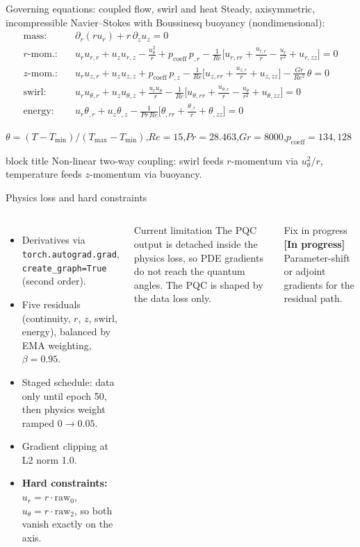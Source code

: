 \documentclass[aspectratio=169,10pt]{beamer}
\newcommand{\pending}{\textcolor{warnorange}{\textbf{[In progress]}}}
\newcommand{\takeaway}[1]{%
  \vfill
  \begin{beamercolorbox}[rounded=true,shadow=false,wd=\linewidth,sep=4pt]{block title}
  \small\centering #1
  \end{beamercolorbox}}
\begin{document}
\begin{frame}{Governing equations: coupled flow, swirl and heat}
\small Steady, axisymmetric, incompressible Navier--Stokes with Boussinesq buoyancy (nondimensional):
\begin{align*}
\text{mass:}\quad & \partial_r(r u_r) + r\,\partial_z u_z = 0\\[2pt]
\text{$r$-mom.:}\quad & u_r u_{r,r} + u_z u_{r,z} - \tfrac{u_\theta^2}{r} + p_{\mathrm{coeff}}\,p_{,r} - \tfrac{1}{Re}\big[u_{r,rr} + \tfrac{u_{r,r}}{r} - \tfrac{u_r}{r^2} + u_{r,zz}\big] = 0\\[2pt]
\text{$z$-mom.:}\quad & u_r u_{z,r} + u_z u_{z,z} + p_{\mathrm{coeff}}\,p_{,z} - \tfrac{1}{Re}\big[u_{z,rr} + \tfrac{u_{z,r}}{r} + u_{z,zz}\big] - \tfrac{Gr}{Re^2}\,\theta = 0\\[2pt]
\text{swirl:}\quad & u_r u_{\theta,r} + u_z u_{\theta,z} + \tfrac{u_r u_\theta}{r} - \tfrac{1}{Re}\big[u_{\theta,rr} + \tfrac{u_{\theta,r}}{r} - \tfrac{u_\theta}{r^2} + u_{\theta,zz}\big] = 0\\[2pt]
\text{energy:}\quad & u_r \theta_{,r} + u_z \theta_{,z} - \tfrac{1}{Pr\,Re}\big[\theta_{,rr} + \tfrac{\theta_{,r}}{r} + \theta_{,zz}\big] = 0
\end{align*}
\begin{center}
\footnotesize $\theta = (T-T_{\min})/(T_{\max}-T_{\min})$,\quad $Re=15$,\quad $Pr=28.463$,\quad $Gr=8000$,\quad $p_{\mathrm{coeff}}=134{,}128$
\end{center}
\takeaway{Non-linear two-way coupling: swirl feeds $r$-momentum via $u_\theta^2/r$, temperature feeds $z$-momentum via buoyancy.}
\end{frame}

\begin{frame}{Physics loss and hard constraints}
\begin{columns}[T,onlytextwidth]
\begin{itemize}\small\setlength{\itemsep}{3pt}
  \item Derivatives via \texttt{torch.autograd.grad}, \texttt{create\_graph=True} (second order).
  \item Five residuals (continuity, $r$, $z$, swirl, energy), balanced by EMA weighting, $\beta=0.95$.
  \item Staged schedule: data only until epoch 50, then physics weight ramped $0\to0.05$.
  \item Gradient clipping at L2 norm 1.0.
  \item \textbf{Hard constraints:} $u_r=r\cdot\mathrm{raw}_0$, $u_\theta=r\cdot\mathrm{raw}_2$, so both vanish exactly on the axis.
\end{itemize}
\begin{alertblock}{Current limitation}
\small The PQC output is detached inside the physics loss, so PDE gradients do not reach the quantum angles. The PQC is shaped by the data loss only.
\end{alertblock}
\begin{block}{Fix in progress \pending}
\small Parameter-shift or adjoint gradients for the residual path.
\end{block}
\end{columns}
\end{frame}
\end{document}
